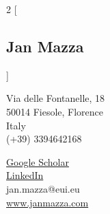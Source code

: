 \documentclass[5pt,a4paper]{article}
\date{}
\begin{document}
\begin{cv}{}
\setlength\cvlabelwidth{50pt}

  \begin{multicols}{2}
	[
	\begin{center}
	\section*{Jan Mazza}
	\end{center}
	]
\begin{flushright}
	\normalsize Via delle Fontanelle, 18\\
    50014 Fiesole, Florence\\
		Italy\\
  (+39) 3394642168\\
\end{flushright}
  
\begin{flushleft}
  \href{https://scholar.google.com/citations?hl=en&user=sbrAYfUAAAAJ}{Google Scholar}\\ 
  \href{https://www.linkedin.com/in/jan-mazza/}{LinkedIn}\\
     jan.mazza@eui.eu\\
		\url{www.janmazza.com} \\
\end{flushleft}
		\end{multicols}
		\vspace{1pt}
		

\end{cv}
\end{document}

